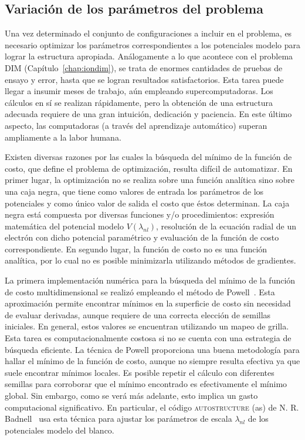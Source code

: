 \subsection{Variación de los parámetros del problema}
\label{sec:powell}

Una vez determinado el conjunto de configuraciones a incluir en el 
problema, es necesario optimizar los parámetros correspondientes a los 
potenciales modelo para lograr la estructura apropiada. Análogamente a 
lo que acontece con el problema DIM (Capítulo~\ref{chap:iondim}), se 
trata de enormes cantidades de pruebas de ensayo y error, hasta que se 
logran resultados satisfactorios. Esta tarea puede llegar a insumir 
meses de trabajo, aún empleando supercomputadoras. Los cálculos en sí se 
realizan rápidamente, pero la obtención de una estructura adecuada 
requiere de una gran intuición, dedicación y paciencia. En este último 
aspecto, las computadoras (a través del aprendizaje automático) superan 
ampliamente a la labor humana.

Existen diversas razones por las cuales la búsqueda del mínimo de la 
función de costo, que define el problema de optimización, resulta 
difícil de automatizar. En primer lugar, la optimización no se realiza 
sobre una función analítica sino sobre una caja negra, que tiene como 
valores de entrada los parámetros de los potenciales y como 
único valor de salida el costo que éstos determinan. La caja negra está 
compuesta por diversas funciones y/o procedimientos: expresión 
matemática del potencial modelo $V(\lambda_{nl})$, resolución de la 
ecuación radial de un electrón con dicho potencial paramétrico y 
evaluación de la función de costo correspondiente. En segundo lugar, la 
función de costo no es una función analítica, por lo cual no es posible 
minimizarla utilizando métodos de gradientes. 

La primera implementación numérica para la búsqueda del mínimo de la 
función de costo multidimensional se realizó empleando el método de 
Powell~\cite{Powell:64,NumRec:07}. Esta aproximación permite encontrar 
mínimos en la superficie de costo sin necesidad de evaluar derivadas, 
aunque requiere de una correcta elección de semillas iniciales. 
En general, estos valores se encuentran utilizando un mapeo de grilla.
Esta tarea es computacionalmente costosa si no se cuenta con una 
estrategia de búsqueda eficiente. La técnica de Powell proporciona una 
buena metodología para hallar el mínimo de la función de costo, aunque 
no siempre resulta efectiva ya que suele encontrar mínimos locales. Es posible 
repetir el cálculo con diferentes semillas para corroborar que el mínimo 
encontrado es efectivamente el mínimo global. Sin embargo, como se verá 
más adelante, esto implica un gasto computacional significativo. En 
particular, el código \textsc{autostructure} (\acs{as}) de N. R. 
Badnell~\cite{Badnell:11} usa esta técnica para ajustar los parámetros 
de escala $\lambda_{nl}$ de los potenciales modelo del blanco. 

